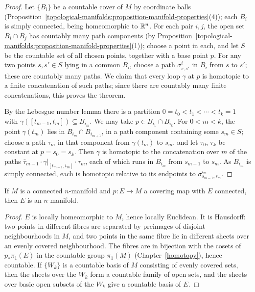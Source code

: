\begin{proof}
Let $\{B_i\}$ be a countable cover of $M$ by coordinate balls (Proposition~\ref{topological-manifolds:proposition-manifold-properties}(4)); each $B_i$ is simply connected, being homeomorphic to $\mathbb{R}^n$. For each pair $i, j$, the open set
$B_i \cap B_j$ has countably many path components (by Proposition~\ref{topological-manifolds:proposition-manifold-properties}(1)); choose a point in each, and let $S$ be the countable set of all chosen points, together with a
base point $p$. For any two points $s, s' \in S$ lying in a common $B_i$, choose a path $\sigma^i_{s,s'}$ in $B_i$ from $s$ to $s'$; these are countably many paths. We claim that every loop $\gamma$ at $p$ is homotopic to a finite
concatenation of such paths; since there are countably many finite concatenations, this proves the theorem.

By the Lebesgue number lemma there is a partition $0 = t_0 < t_1 < \cdots < t_k = 1$ with $\gamma([t_{m-1}, t_m]) \subseteq B_{i_m}$. We may take $p \in B_{i_1} \cap B_{i_k}$. For $0 < m < k$, the point $\gamma(t_m)$ lies in
$B_{i_m} \cap B_{i_{m+1}}$, in a path component containing some $s_m \in S$; choose a path $\tau_m$ in that component from $\gamma(t_m)$ to $s_m$, and let $\tau_0$, $\tau_k$ be constant at $p = s_0 = s_k$. Then $\gamma$ is homotopic to
the concatenation over $m$ of the paths $\bar\tau_{m-1} \cdot \gamma|_{[t_{m-1},t_m]} \cdot \tau_m$, each of which runs in $B_{i_m}$ from $s_{m-1}$ to $s_m$. As $B_{i_m}$ is simply connected, each is homotopic relative to its
endpoints to $\sigma^{i_m}_{s_{m-1},s_m}$.
\end{proof}

\begin{corollary}\label{topological-manifolds:corollary-covering-manifold}
If $M$ is a connected $n$-manifold and $p \colon E \to M$ a covering map with $E$ connected, then $E$ is an $n$-manifold.
\end{corollary}

\begin{proof}
$E$ is locally homeomorphic to $M$, hence locally Euclidean. It is Hausdorff: two points in different fibres are separated by preimages of disjoint neighbourhoods in $M$, and two points in the same fibre lie in different
sheets over an evenly covered neighbourhood. The fibres are in bijection with the cosets of $p_*\pi_1(E)$ in the countable group $\pi_1(M)$ (Chapter~\ref{homotopy}), hence countable. If $\{W_k\}$ is a countable basis of $M$
consisting of evenly covered sets, then the sheets over the $W_k$ form a countable family of open sets, and the sheets over basic open subsets of the $W_k$ give a countable basis of $E$.
\end{proof}

